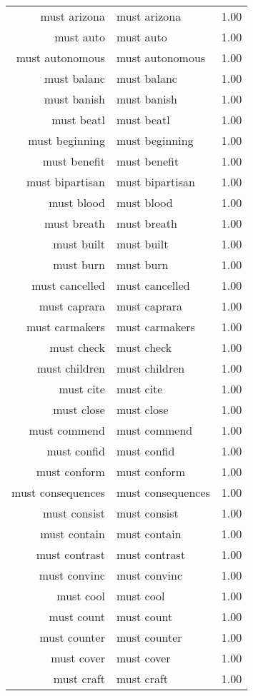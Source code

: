 \begin{table}[ht]
\begin{tabular}{rlr}
  must arizona & must arizona & 1.00 \\ 
  must auto & must auto & 1.00 \\ 
  must autonomous & must autonomous & 1.00 \\ 
  must balanc & must balanc & 1.00 \\ 
  must banish & must banish & 1.00 \\ 
  must beatl & must beatl & 1.00 \\ 
  must beginning & must beginning & 1.00 \\ 
  must benefit & must benefit & 1.00 \\ 
  must bipartisan & must bipartisan & 1.00 \\ 
  must blood & must blood & 1.00 \\ 
  must breath & must breath & 1.00 \\ 
  must built & must built & 1.00 \\ 
  must burn & must burn & 1.00 \\ 
  must cancelled & must cancelled & 1.00 \\ 
  must caprara & must caprara & 1.00 \\ 
  must carmakers & must carmakers & 1.00 \\ 
  must check & must check & 1.00 \\ 
  must children & must children & 1.00 \\ 
  must cite & must cite & 1.00 \\ 
  must close & must close & 1.00 \\ 
  must commend & must commend & 1.00 \\ 
  must confid & must confid & 1.00 \\ 
  must conform & must conform & 1.00 \\ 
  must consequences & must consequences & 1.00 \\ 
  must consist & must consist & 1.00 \\ 
  must contain & must contain & 1.00 \\ 
  must contrast & must contrast & 1.00 \\ 
  must convinc & must convinc & 1.00 \\ 
  must cool & must cool & 1.00 \\ 
  must count & must count & 1.00 \\ 
  must counter & must counter & 1.00 \\ 
  must cover & must cover & 1.00 \\ 
  must craft & must craft & 1.00 \\ 

\end{tabular}
\end{table}
